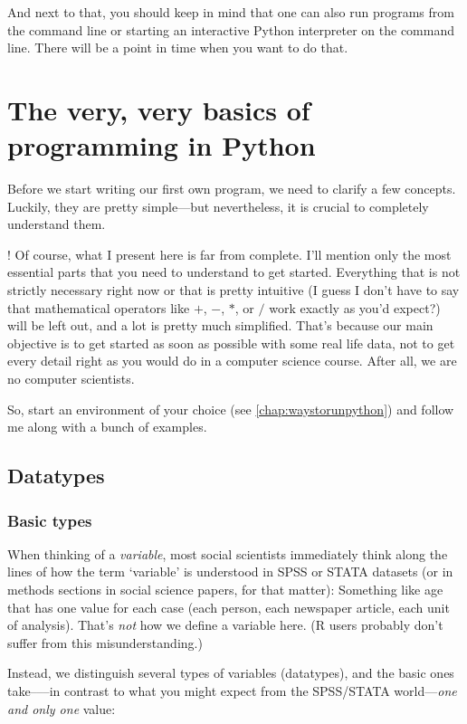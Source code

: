 \documentclass[a4paper,12pt]{book}
\renewcommand{\texttt}[1]{%
  \begingroup
  \ttfamily
  \begingroup\lccode`~=`/\lowercase{\endgroup\def~}{/\discretionary{}{}{}}%
  \begingroup\lccode`~=`[\lowercase{\endgroup\def~}{[\discretionary{}{}{}}%
  \begingroup\lccode`~=`.\lowercase{\endgroup\def~}{.\discretionary{}{}{}}%
  \begingroup\lccode`~=`(\lowercase{\endgroup\def~}{(\discretionary{}{}{}}%
  \catcode`/=\active\catcode`[=\active\catcode`.=\active\catcode`(=\active
  \scantokens{#1\noexpand}%
  \endgroup
}
\let\oldquote\quote
\let\endoldquote\endquote
\renewenvironment{quote}{
\oldquote\footnotesize
\lettrine[lines=3]{\color{BrickRed}!}{ }}
{\endoldquote}
\begin{document}
And next to that, you should keep in mind that one can also run programs from the command line or starting an interactive Python interpreter on the command line. There will be a point in time when you want to do that.

 
 
 
\chapter{The very, very basics of programming in Python}
\label{chap:basics}
Before we start writing our first own program, we need to clarify a few concepts. Luckily, they are pretty simple---but nevertheless, it is crucial to completely understand them. 

\begin{quote}
Of course, what I present here is far from complete. I'll mention only the most essential parts that you need to understand to get started. Everything that is not strictly necessary right now or that is pretty intuitive (I guess I don't have to say that mathematical operators like $+$, $-$, $*$, or $/$ work exactly as you'd expect?) will be left out, and a lot is pretty much simplified. That's because our main objective is to get started as soon as possible with some real life data, not to get every detail right as you would do in a computer science course. After all, we are no computer scientists.  
\end{quote}

So, start an environment of your choice (see \ref{chap:waystorunpython}) and follow me along with a bunch of examples.


\section{Datatypes}
\label{datatypes}
\subsection{Basic types}
When thinking of a \emph{variable}, most social scientists immediately think along the lines of how the term `variable' is understood in SPSS or STATA datasets (or in methods sections in social science papers, for that matter): Something like age that has one value for each case (each person, each newspaper article, each unit of analysis). That's \emph{not} how we define a variable here. (R users probably don't suffer from this misunderstanding.)

Instead, we distinguish several types of variables (datatypes), and the basic ones take–––in contrast to what you might expect from the SPSS/STATA world---\emph{one and only one} value:
\end{document}
